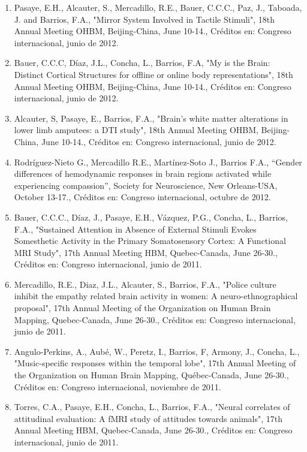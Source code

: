\documentclass[12pt]{article}
\begin{document}
\begin{enumerate}
\item Pasaye, E.H., Alcauter, S., Mercadillo, R.E., Bauer, C.C.C., Paz, J., Taboada, J. and Barrios, F.A., "Mirror System Involved in 
Tactile Stimuli", 18th Annual Meeting OHBM, Beijing-China, June 10-14., Créditos en: Congreso internacional, junio de 2012.

\item Bauer, C.C.C, Díaz, J.L., Concha, L., Barrios, F.A, "My is the Brain: Distinct Cortical Structures for offline or online body 
representations", 18th Annual Meeting OHBM, Beijing-China, June 10-14., Créditos en: Congreso internacional, junio de 2012.

\item Alcauter, S, Pasaye, E., Barrios, F.A., "Brain's white matter alterations in lower limb amputees: a DTI study", 18th Annual 
Meeting 
OHBM, Beijing-China, June 10-14., Créditos en: Congreso internacional, junio de 2012.

\item Rodríguez-Nieto G., Mercadillo R.E., Martínez-Soto J., Barrios F.A., “Gender differences of hemodynamic responses in brain 
regions 
activated while experiencing compassion”, Society for Neuroscience, New Orleans-USA, October 13-17., Créditos en: Congreso 
internacional, octubre de 2012.

\item Bauer, C.C.C., Díaz, J., Pasaye, E.H., Vázquez, P.G., Concha, L., Barrios, F.A., "Sustained Attention in Absence of External 
Stimuli Evokes Somesthetic Activity in the Primary Somatosensory Cortex: A Functional MRI Study", 17th Annual Meeting HBM, 
Quebec-Canada, June 26-30., Créditos en: Congreso internacional, junio de 2011.

\item Mercadillo, R.E., Diaz, J.L., Alcauter, S., Barrios, F.A., "Police culture inhibit the empathy related brain activity in women: A 
neuro-ethnographical proposal", 17th Annual Meeting of the Organization on Human Brain Mapping, Quebec-Canada, June 26-30., Créditos 
en: Congreso internacional, junio de 2011.

\item Angulo-Perkins, A., Aubé, W., Peretz, I., Barrios, F, Armony, J., Concha, L., "Music-specific responses within the temporal 
lobe", 
17th Annual Meeting of the Organization on Human Brain Mapping, Québec-Canada, June 26-30., Créditos en: Congreso internacional, 
noviembre de 2011.

\item Torres, C.A., Pasaye, E.H., Concha, L., Barrios, F.A., "Neural correlates of attitudinal evaluation: A fMRI study of attitudes 
towards animals", 17th Annual Meeting HBM, Quebec-Canada, June 26-30., Créditos en: Congreso internacional, junio de 2011.


\end{enumerate}
\end{document}
